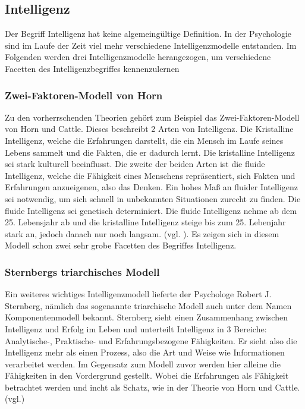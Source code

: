 \documentclass[a4paper, 11pt]{scrartcl}
\begin{document}
\subsection{Intelligenz}
Der Begriff Intelligenz hat keine algemeingültige Definition. In der Psychologie sind im Laufe der Zeit viel mehr verschiedene Intelligenzmodelle entstanden. Im Folgenden werden drei Intelligenzmodelle herangezogen, um verschiedene Facetten des Intelligenzbegriffes kennenzulernen

\subsubsection{Zwei-Faktoren-Modell von Horn}
Zu den vorherrschenden Theorien gehört zum Beispiel das Zwei-Faktoren-Modell von Horn und Cattle. Dieses beschreibt 2 Arten von Intelligenz. Die Kristalline Intelligenz, welche die Erfahrungen darstellt, die ein Mensch im Laufe seines Lebens sammelt und die Fakten, die er dadurch lernt. Die kristalline Intelligenz sei stark kulturell beeinflusst. Die zweite der beiden Arten ist die fluide Intelligenz, welche die Fähigkeit eines Menschens repräsentiert, sich Fakten und Erfahrungen anzueigenen, also das Denken. Ein hohes Maß an fluider Intelligenz sei notwendig, um sich schnell in unbekannten Situationen zurecht zu finden. Die fluide Intelligenz sei genetisch determiniert. Die fluide Intelligenz nehme ab dem 25. Lebensjahr ab und die kristalline Intelligenz steige bis zum 25. Lebenjahr stark an, jedoch danach nur noch langsam. (vgl. \cite{Dorsch2019}). Es zeigen sich in diesem Modell schon zwei sehr grobe Facetten des Begriffes Intelligenz.

\subsubsection{Sternbergs triarchisches Modell}
Ein weiteres wichtiges Intelligenzmodell lieferte der Psychologe Robert J. Sternberg, nämlich das sogenannte triarchische Modell auch unter dem Namen Komponentenmodell bekannt. Sternberg sieht einen Zusammenhang zwischen Intelligenz und Erfolg im Leben und unterteilt Intelligenz in 3 Bereiche: Analytische-, Praktische- und Erfahrungsbezogene Fähigkeiten. Er sieht also die Intelligenz mehr als einen Prozess, also die Art und Weise wie Informationen verarbeitet werden. Im Gegensatz zum Modell zuvor werden hier alleine die Fähigkeiten in den Vordergrund gestellt. Wobei die Erfahrungen als Fähigkeit betrachtet werden und incht als Schatz, wie in der Theorie von Horn und Cattle. (vgl.\cite{Stern1984})
\end{document}
